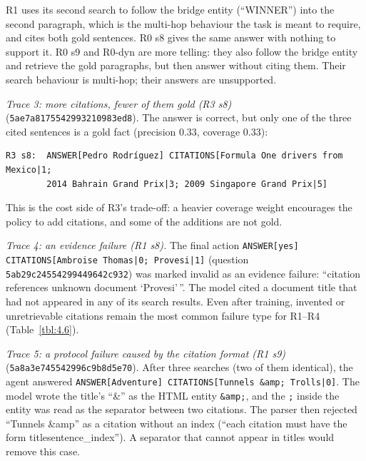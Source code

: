 R1 uses its second search to follow the bridge entity (``WINNER'') into
the second paragraph, which is the multi-hop behaviour the task is meant
to require, and cites both gold sentences. R0 s8 gives the same answer
with nothing to support it. R0 s9 and R0-dyn are more telling: they also
follow the bridge entity and retrieve the gold paragraphs, but then
answer without citing them. Their search behaviour is multi-hop; their
answers are unsupported.

\emph{Trace 3: more citations, fewer of them gold (R3 s8)}
(\texttt{5ae7\allowbreak{}a817\allowbreak{}5542\allowbreak{}9932\allowbreak{}1098\allowbreak{}3ed8\allowbreak{}}).
The answer is correct, but only one of the three cited sentences is a
gold fact (precision 0.33, coverage 0.33):

\begin{Verbatim}
R3 s8:  ANSWER[Pedro Rodríguez] CITATIONS[Formula One drivers from Mexico|1;
        2014 Bahrain Grand Prix|3; 2009 Singapore Grand Prix|5]
\end{Verbatim}

This is the cost side of R3's trade-off: a heavier coverage weight
encourages the policy to add citations, and some of the additions are
not gold.

\emph{Trace 4: an evidence failure (R1 s8).} The final action
\texttt{ANSWER{[}\allowbreak{}yes{]} CITATIONS{[}\allowbreak{}Ambroise Thomas|0; Provesi|1{]}}
(question
\texttt{5ab2\allowbreak{}9c24\allowbreak{}5542\allowbreak{}9944\allowbreak{}9642\allowbreak{}c932\allowbreak{}})
was marked invalid as an evidence failure: ``citation references unknown
document `Provesi'\,''. The model cited a document title that had not
appeared in any of its search results. Even after training, invented or
unretrievable citations remain the most common failure type for R1--R4
(Table~\ref{tbl:4.6}).

\emph{Trace 5: a protocol failure caused by the citation format (R1 s9)}
(\texttt{5a8a\allowbreak{}3e74\allowbreak{}5542\allowbreak{}996c\allowbreak{}9b8d\allowbreak{}5e70\allowbreak{}}).
After three searches (two of them identical), the agent answered
\texttt{ANSWER{[}\allowbreak{}Adventure{]} CITATIONS{[}\allowbreak{}Tunnels \&amp; Trolls|0{]}}.
The model wrote the title's ``\&'' as the HTML entity \texttt{\&amp;},
and the \texttt{;} inside the entity was read as the separator between
two citations. The parser then rejected ``Tunnels \&amp'' as a citation
without an index (``each citation must have the form
title\textbar sentence\_index''). A separator that cannot appear in
titles would remove this case.

